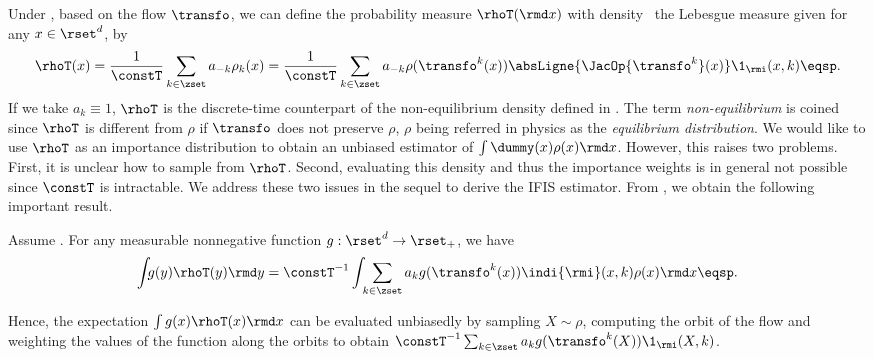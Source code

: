    Under
  , based on the flow $\transfo$, we can define the probability measure
  $\rhoT(\rmd x)$ with density \wrt~the Lebesgue measure given for
  any $x \in \rset^d$, by
\begin{equation*}
    \rhoT(x) =  \frac{1}{\constT}\sum_{k \in \zset} a_{-k} \rho_k(x)= \frac{1}{\constT} \sum_{k \in \zset} a_{-k} \rho(\transfo^k(x))  \absLigne{\JacOp{\transfo^k}(x)} \1_{\rmi}(x,k)\eqsp.
  \end{equation*}
  If we take $a_k \equiv 1$,  $\rhoT$ is the discrete-time
  counterpart of the non-equilibrium density defined in
  \citep[Eq. (6)]{rotskoff:vanden-eijden:2019}. The term
  \textit{non-equilibrium} is coined since $\rhoT$ is different from $\rho$ if $\transfo$ does not
  preserve $\rho$, $\rho$ being referred
  in physics as the \textit{equilibrium distribution}. We would like to use
  $\rhoT$ as an importance distribution to obtain an unbiased
  estimator of $\int \dummy(x) \rho(x) \rmd x$.
  However, this raises two problems. First, it is unclear how to sample from $\rhoT$. Second, evaluating this density and thus the importance weights is in general not possible since $\constT$ is intractable. We address these two issues in the sequel to derive the IFIS estimator. From , we obtain the following important result.
\begin{theorem}
 \label{theo:inf_non_eq}
 Assume .  For any measurable nonnegative function $g:\rset^d \to \rset_+$, we have
\begin{equation*}
\label{eq:inf_non_eq_av}
  \int_{}
g(y)     \rhoT(y) \rmd y  = \constT^{-1} \int_{} \sum_{k\in\zset} a_{k}g(\transfo^k(x)) \indi{\rmi}(x,k) \rho({x})\rmd x \eqsp.
\end{equation*}
\end{theorem}
Hence, the expectation $\int g(x) \rhoT(x)\rmd x$ can be evaluated unbiasedly by sampling $X\sim\rho$, computing the orbit of the flow and weighting the values of the function along the orbits to obtain 
  $\constT^{-1}\sum_{k \in \zset}
  a_{k}g(\transfo^k(X))\1_{\rmi}(X,k)$.
  
